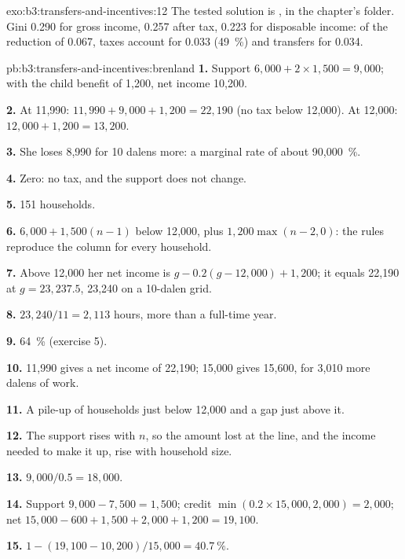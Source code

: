 \begin{solution}{exo:b3:transfers-and-incentives:12}
The tested solution is , in the chapter's  folder.
Gini 0.290 for gross income, 0.257 after tax, 0.223 for disposable income: of the
reduction of 0.067, taxes account for 0.033 (49~\%) and transfers for 0.034.
\end{solution}

\begin{solution}{pb:b3:transfers-and-incentives:brenland}
\textbf{1.} Support $6{,}000 + 2 \times 1{,}500 = 9{,}000$; with the child benefit of 1{,}200, net income 10{,}200.

\textbf{2.} At 11{,}990: $11{,}990 + 9{,}000 + 1{,}200 = 22{,}190$ (no tax below 12{,}000). At 12{,}000: $12{,}000 + 1{,}200 = 13{,}200$.

\textbf{3.} She loses 8{,}990 for 10 dalens more: a marginal rate of about 90{,}000~\%.

\textbf{4.} Zero: no tax, and the support does not change.

\textbf{5.} 151 households.

\textbf{6.} $6{,}000 + 1{,}500(n - 1)$ below 12{,}000, plus $1{,}200\max(n - 2, 0)$: the rules reproduce the column
for every household.

\textbf{7.} Above 12{,}000 her net income is $g - 0.2(g - 12{,}000) + 1{,}200$; it equals 22{,}190 at $g = 23{,}237.5$,
23{,}240 on a 10-dalen grid.

\textbf{8.} $23{,}240/11 = 2{,}113$ hours, more than a full-time year.

\textbf{9.} 64~\% (exercise 5).

\textbf{10.} 11{,}990 gives a net income of 22{,}190; 15{,}000 gives 15{,}600, for 3{,}010 more
dalens of work.

\textbf{11.} A pile-up of households just below 12{,}000 and a gap just above it.

\textbf{12.} The support rises with $n$, so the amount lost at the line, and the income
needed to make it up, rise with household size.

\textbf{13.} $9{,}000/0.5 = 18{,}000$.

\textbf{14.} Support $9{,}000 - 7{,}500 = 1{,}500$; credit $\min(0.2 \times 15{,}000, 2{,}000) = 2{,}000$; net $15{,}000 - 600 + 1{,}500 + 2{,}000 + 1{,}200 =
19{,}100$.

\textbf{15.} $1 - (19{,}100 - 10{,}200)/15{,}000 = 40.7~\%$.


\end{solution}
